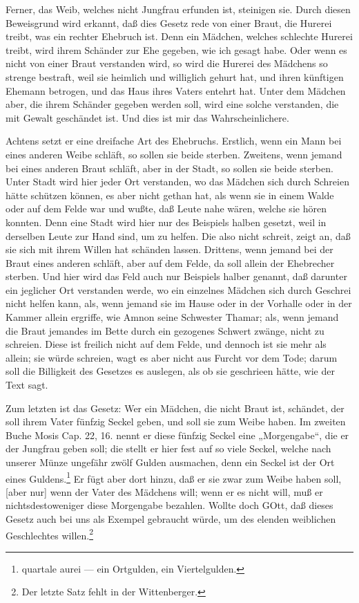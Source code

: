Ferner, das Weib, welches nicht Jungfrau erfunden ist, steinigen sie. Durch diesen Beweisgrund wird erkannt, daß dies Gesetz rede von einer Braut, die Hurerei treibt, was ein rechter Ehebruch ist. Denn ein Mädchen, welches schlechte Hurerei treibt, wird ihrem Schänder zur Ehe gegeben, wie ich gesagt habe. Oder wenn es nicht von einer Braut verstanden wird, so wird die Hurerei des Mädchens so strenge bestraft, weil sie heimlich und williglich gehurt hat, und ihren künftigen Ehemann betrogen, und das Haus ihres Vaters entehrt hat. Unter dem Mädchen aber, die ihrem Schänder gegeben werden soll, wird eine solche verstanden, die mit Gewalt geschändet ist. Und dies ist mir das Wahrscheinlichere.

Achtens setzt er eine dreifache Art des Ehebruchs. Erstlich, wenn ein Mann bei eines anderen Weibe schläft, so sollen sie beide sterben. Zweitens, wenn jemand bei eines anderen Braut schläft, aber in der Stadt, so sollen sie beide sterben. Unter Stadt wird hier jeder Ort verstanden, wo das Mädchen sich durch Schreien hätte schützen können, es aber nicht gethan hat, als wenn sie in einem Walde oder auf dem Felde war und wußte, daß Leute nahe wären, welche sie hören konnten. Denn eine Stadt wird hier nur des Beispiels halben gesetzt, weil in derselben Leute zur Hand sind, um zu helfen. Die also nicht schreit, zeigt an, daß sie sich mit ihrem Willen hat schänden lassen. Drittens, wenn jemand bei der Braut eines anderen schläft, aber auf dem Felde, da soll allein der Ehebrecher sterben. Und hier wird das Feld auch nur Beispiels halber genannt, daß darunter ein jeglicher Ort verstanden werde, wo ein einzelnes Mädchen sich durch Geschrei nicht helfen kann, als, wenn jemand sie im Hause oder in der Vorhalle oder in der Kammer allein ergriffe, wie Amnon seine Schwester Thamar; als, wenn jemand die Braut jemandes im Bette durch ein gezogenes Schwert zwänge, nicht zu schreien. Diese ist freilich nicht auf dem Felde, und dennoch ist sie mehr als allein; sie würde schreien, wagt es aber nicht aus Furcht vor dem Tode; darum soll die Billigkeit des Gesetzes es auslegen, als ob sie geschrieen hätte, wie der Text sagt.

Zum letzten ist das Gesetz: Wer ein Mädchen, die nicht Braut ist, schändet, der soll ihrem Vater fünfzig Seckel geben, und soll sie zum Weibe haben. Im zweiten Buche Mosis Cap. 22, 16. nennt er diese fünfzig Seckel eine „Morgengabe“, die er der Jungfrau geben soll; die stellt er hier fest auf so viele Seckel, welche nach unserer Münze ungefähr zwölf Gulden ausmachen, denn ein Seckel ist der Ort eines Guldens.\footnote{quartale aurei — ein Ortgulden, ein Viertelgulden.} Er fügt aber dort hinzu, daß er sie zwar zum Weibe haben soll, [aber nur] wenn der Vater des Mädchens will; wenn er es nicht will, muß er nichtsdestoweniger diese Morgengabe bezahlen. Wollte doch GOtt, daß dieses Gesetz auch bei uns als Exempel gebraucht würde, um des elenden weiblichen Geschlechtes willen.\footnote{Der letzte Satz fehlt in der Wittenberger.}

